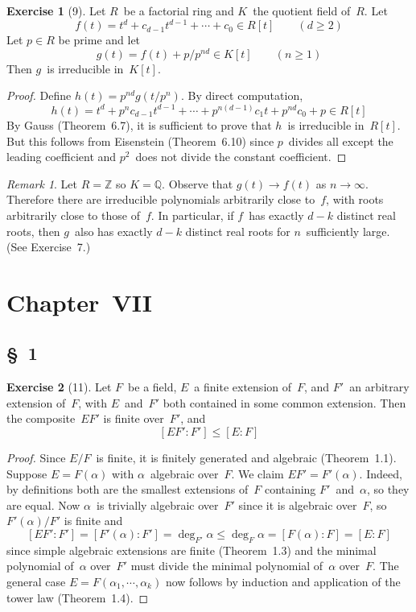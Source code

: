 \documentclass[letterpaper,12pt]{article}
\newcommand{\Z}{\mathbb{Z}}
\newcommand{\Q}{\mathbb{Q}}
\theoremstyle{definition}
\newtheorem*{exer}{Exercise}
\theoremstyle{remark}
\newtheorem*{rmk}{Remark}
\theoremstyle{direction}
\begin{document}
\begin{exer}[9]
Let \(R\)~be a factorial ring and \(K\)~the quotient field of~\(R\). Let
\[f(t)=t^d+c_{d-1}t^{d-1}+\cdots+c_0\in R[t]\qquad(d\ge2)\]
Let \(p\in R\) be prime and let
\[g(t)=f(t)+p/p^{nd}\in K[t]\qquad(n\ge1)\]
Then \(g\)~is irreducible in~\(K[t]\).
\end{exer}
\begin{proof}
Define \(h(t)=p^{nd}g(t/p^n)\). By direct computation,
\[h(t)=t^d+p^nc_{d-1}t^{d-1}+\cdots+p^{n(d-1)}c_1t+p^{nd}c_0+p\in R[t]\]
By Gauss (Theorem~6.7), it is sufficient to prove that \(h\)~is irreducible in~\(R[t]\). But this follows from Eisenstein (Theorem~6.10) since \(p\)~divides all except the leading coefficient and \(p^2\)~does not divide the constant coefficient.
\end{proof}
\begin{rmk}
Let \(R=\Z\) so \(K=\Q\). Observe that \(g(t)\to f(t)\) as \(n\to\infty\). Therefore there are irreducible polynomials arbitrarily close to~\(f\), with roots arbitrarily close to those of~\(f\). In particular, if \(f\)~has exactly \(d-k\) distinct real roots, then \(g\)~also has exactly \(d-k\) distinct real roots for \(n\)~sufficiently large. (See Exercise~7.)
\end{rmk}

\section*{Chapter~VII}

\subsection*{\S~1}
\begin{exer}[11]
Let \(F\)~be a field, \(E\)~a finite extension of~\(F\), and \(F'\)~an arbitrary extension of~\(F\), with \(E\)~and~\(F'\) both contained in some common extension. Then the composite~\(EF'\) is finite over~\(F'\), and
\[[EF':F']\le[E:F]\]
\end{exer}
\begin{proof}
Since \(E/F\)~is finite, it is finitely generated and algebraic (Theorem~1.1). Suppose \(E=F(\alpha)\) with \(\alpha\)~algebraic over~\(F\). We claim \(EF'=F'(\alpha)\). Indeed, by definitions both are the smallest extensions of~\(F\) containing \(F'\)~and~\(\alpha\), so they are equal. Now \(\alpha\)~is trivially algebraic over~\(F'\) since it is algebraic over~\(F\), so \(F'(\alpha)/F'\) is finite and
\[[EF':F']=[F'(\alpha):F']=\deg_{F'}\alpha\le\deg_F\alpha=[F(\alpha):F]=[E:F]\]
since simple algebraic extensions are finite (Theorem~1.3) and the minimal polynomial of~\(\alpha\) over~\(F'\) must divide the minimal polynomial of~\(\alpha\) over~\(F\). The general case \(E=F(\alpha_1,\cdots,\alpha_k)\) now follows by induction and application of the tower law (Theorem~1.4).
\end{proof}
\end{document}
